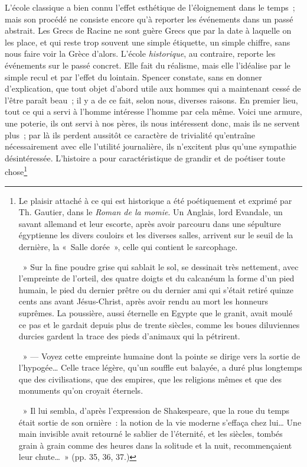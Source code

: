 \documentclass[french,twoside]{book} %
\begin{document}
L’école classique a bien connu l’effet esthétique de l’éloignement dans le temps ; mais son procédé ne consiste encore qu’à reporter les événements dans un passé abstrait. Les Grecs de Racine ne sont guère Grecs que par la date à laquelle on les place, et qui reste trop souvent une simple étiquette, un simple chiffre, sans nous faire voir la Grèce d’alors. L’école \emph{historique}, au contraire, reporte les événements sur le passé concret. Elle fait du réalisme, mais elle l’idéalise par le simple recul et par l’effet du lointain. Spencer constate, sans en donner d’explication, que tout objet d’abord utile aux hommes qui a maintenant cessé de l’être paraît beau ; il y a de ce fait, selon nous, diverses raisons. En premier lieu, tout ce qui a servi à l’homme intéresse l’homme par cela même. Voici une armure, une poterie, ils ont servi à nos pères, ils nous intéressent donc, mais ils ne servent plus ; par là ils perdent aussitôt ce caractère de trivialité qu’entraîne nécessairement avec elle l’utilité journalière, ils n’excitent plus qu’une sympathie désintéressée. L’histoire a pour caractéristique de grandir et de poétiser toute chose\footnote{\noindent Le plaisir attaché à ce qui est historique a été poétiquement et exprimé par Th. Gautier, dans le \emph{Roman de la momie}. Un Anglais, lord Evandale, un savant allemand et leur escorte, après avoir parcouru dans une sépulture égyptienne les divers couloirs et les diverses salles, arrivent sur le seuil de la dernière, la « Salle dorée », celle qui contient le sarcophage. \par
 » Sur la fine poudre grise qui sablait le sol, se dessinait très nettement, avec l’empreinte de l’orteil, des quatre doigts et du calcanéum la forme d’un pied humain, le pied du dernier prêtre ou du dernier ami qui s’était retiré quinze cents ans avant Jésus-Christ, après avoir rendu au mort les honneurs suprêmes. La poussière, aussi éternelle en Egypte que le granit, avait moulé ce pas et le gardait depuis plus de trente siècles, comme les boues diluviennes durcies gardent la trace des pieds d’animaux qui la pétrirent.\par
 » — Voyez cette empreinte humaine dont la pointe se dirige vers la sortie de l’hypogée… Celle trace légère, qu’un souffle eut balayée, a duré plus longtemps que des civilisations, que des empires, que les religions mêmes et que des monuments qu’on croyait éternels. \par
 » Il lui sembla, d’après l’expression de Shakespeare, que la roue du temps était sortie de son ornière : la notion de la vie moderne s’effaça chez lui… Une main invisible avait retourné le sablier de l’éternité, et les siècles, tombés grain à grain comme des heures dans la solitude et la nuit, recommençaient leur chute… » (pp. 35, 36, 37.)
}
\end{document}
